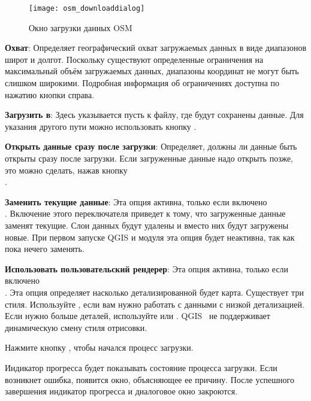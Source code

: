 \begin{figure}[ht]
   \centering
   \texttt{[image: osm\_downloaddialog]}
   \caption{Окно загрузки данных OSM \wincaption}\label{fig:osmdownload}
\end{figure}

\begin{description}
\item \textbf{Охват}: Определяет географический охват загружаемых
данных в виде диапазонов широт и долгот. Поскольку существуют
определенные ограничения на максимальный объём загружаемых данных,
диапазоны координат не могут быть слишком широкими. Подробная информация
об ограничениях доступна по нажатию кнопки
 справа.
\item \textbf{Загрузить в}: Здесь указывается пусть к файлу, где будут
сохранены данные. Для указания другого пути можно использовать кнопку
.
\item \textbf{Открыть данные сразу после загрузки}: Определяет, должны
ли данные быть открыты сразу после загрузки. Если загруженные данные
надо открыть позже, это можно сделать, нажав кнопку \\
.
\item \textbf{Заменить текущие данные}: Эта опция активна, только если
включено \\
. Включение этого
переключателя приведет к тому, что загруженные данные заменят текущие.
Слои данных будут удалены и вместо них будут загружены новые. При первом
запуске QGIS и модуля эта опция будет неактивна, так как пока нечего
заменять.
\item \textbf{Использовать пользовательский рендерер}: Эта опция
активна, только если включено \\
. Эта опция
определяет насколько детализированной будет карта. Существует три стиля.
Используйте , если вам нужно работать с данными
с низкой детализацией. Если нужно больше деталей, используйте
 или . QGIS~\CURRENT
не поддерживает динамическую смену стиля отрисовки.
\end{description}

Нажмите кнопку , чтобы начался процесс загрузки.

Индикатор прогресса будет показывать состояние процесса загрузки. Если
возникнет ошибка, появится окно, объясняющее ее причину. После успешного
завершения индикатор прогресса и диалоговое окно закроются.

